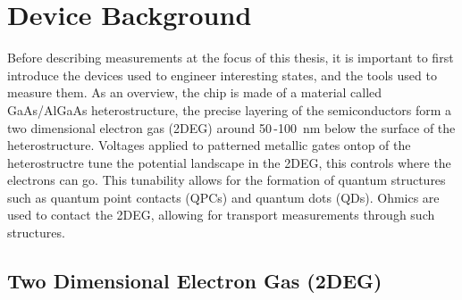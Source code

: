 \chapter{Device Background}\label{cha:device_background}

Before describing measurements at the focus of this thesis, it is important to first introduce the devices used to engineer interesting states, and the tools used to measure them. As an overview, the chip is made of a material called GaAs/AlGaAs heterostructure, the precise layering of the semiconductors form a two dimensional electron gas (2DEG) around 50\,-\qty{100}{nm} below the surface of the heterostructure. Voltages applied to patterned metallic gates ontop of the heterostructre tune the potential landscape in the 2DEG, this controls where the electrons can go. This tunability allows for the formation of quantum structures such as quantum point contacts (QPCs) and quantum dots (QDs). Ohmics are used to contact the 2DEG, allowing for transport measurements through such structures. 



\section{Two Dimensional Electron Gas (2DEG)}



